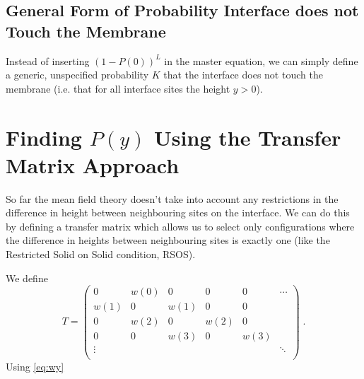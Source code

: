 \documentclass[a4paper,10pt]{article}
\newcommand{\py}{P(y)}
\begin{document}
\subsection{General Form of Probability Interface does not Touch the Membrane}

Instead of inserting $(1-P(0))^L$ in the master equation, we can simply define a generic, unspecified probability $K$ that the interface does not touch the membrane (i.e. that for all interface sites the height $y>0$).

\section{Finding $\py$ Using the Transfer Matrix Approach}

So far the mean field theory doesn't take into account any restrictions in the difference in height between neighbouring sites on the interface. We can do this by defining a transfer matrix which allows us to select only configurations where the difference in heights between neighbouring sites is exactly one (like the Restricted Solid on Solid condition, RSOS). 

We define
\begin{equation}
  T = \begin{pmatrix}
       0      & w(0)   & 0      & 0      & 0      & \cdots \\
       w(1)   & 0      & w(1)   & 0      & 0      &        \\
       0      & w(2)   & 0      & w(2)   & 0      &        \\
       0      & 0      & w(3)   & 0      & w(3)   &        \\
       \vdots &        &        &        &        & \ddots \\
      \end{pmatrix} \;.
\end{equation}
Using \eqref{eq:wy}
\end{document}
